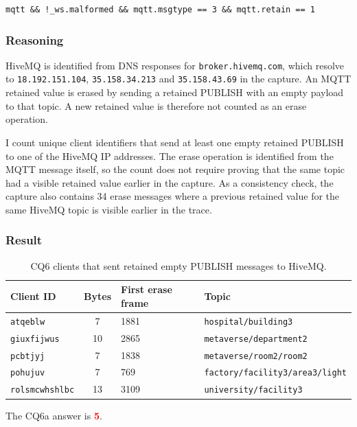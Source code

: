 \documentclass[a4paper,11pt]{article}
\newcommand{\answer}[1]{\textbf{\textcolor{red}{#1}}}
\newcommand{\code}[1]{\texttt{#1}}
\begin{document}
\begin{lstlisting}
mqtt && !_ws.malformed && mqtt.msgtype == 3 && mqtt.retain == 1
\end{lstlisting}

\subsubsection{Reasoning}
HiveMQ is identified from DNS responses for \code{broker.hivemq.com}, which resolve
to \code{18.192.151.104}, \code{35.158.34.213} and \code{35.158.43.69} in the
capture. An MQTT retained value is erased by sending a retained PUBLISH with an
empty payload to that topic. A new retained value is therefore not counted as an
erase operation.

I count unique client identifiers that send at least one empty retained PUBLISH to
one of the HiveMQ IP addresses. The erase operation is identified from the MQTT
message itself, so the count does not require proving that the same topic had a
visible retained value earlier in the capture. As a consistency check, the capture
also contains 34 erase messages where a previous retained value for the same HiveMQ
topic is visible earlier in the trace.

\subsubsection{Result}
\begin{table}[H]
\centering
\caption{CQ6 clients that sent retained empty PUBLISH messages to HiveMQ.}
\begin{tabularx}{\textwidth}{@{}l c l X@{}}
\toprule
Client ID & Bytes & First erase frame & Topic \\
\midrule
\code{atqeblw} & 7 & 1881 & \code{hospital/\allowbreak building3} \\
\code{giuxfijwus} & 10 & 2865 & \code{metaverse/\allowbreak department2} \\
\code{pcbtjyj} & 7 & 1838 & \code{metaverse/\allowbreak room2/\allowbreak room2} \\
\code{pohujuv} & 7 & 769 & \code{factory/\allowbreak facility3/\allowbreak area3/\allowbreak light} \\
\code{rolsmcwhshlbc} & 13 & 3109 & \code{university/\allowbreak facility3} \\
\bottomrule
\end{tabularx}
\end{table}

The CQ6a answer is \answer{5}.
\end{document}
